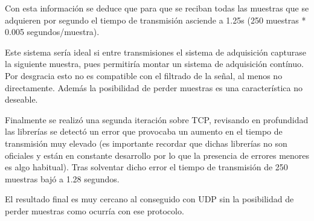 Con esta información se deduce que para que se reciban todas las muestras que se adquieren por segundo el tiempo de transmisión asciende a 1.25s (250 muestras * 0.005 segundos/muestra).

Este sistema sería ideal si entre transmisiones el sistema de adquisición capturase la siguiente muestra, pues permitiría montar un sistema de adquisición contínuo. Por desgracia esto no es compatible con el filtrado de la señal, al menos no directamente. Además la posibilidad de perder muestras es una característica no deseable.

Finalmente se realizó una segunda iteración sobre TCP, revisando en profundidad las librerías se detectó un error que provocaba un aumento en el tiempo de transmisión muy elevado (es importante recordar que dichas librerías no son oficiales y están en constante desarrollo por lo que la presencia de errores menores es algo habitual). Tras solventar dicho error el tiempo de transmisión de 250 muestras bajó a 1.28 segundos.

El resultado final es muy cercano al conseguido con UDP sin la posibilidad de perder muestras como ocurría con ese protocolo.